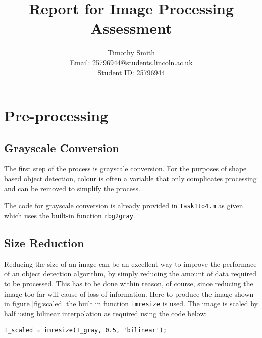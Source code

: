 \documentclass{article}
\title{Report for Image Processing Assessment}
\author{Timothy Smith \\
        Email: \href{mailto:25796944@students.lincoln.ac.uk}{25796944@students.lincoln.ac.uk} \\
        Student ID: 25796944}
\begin{document}
\begin{titlepage}
\maketitle

\end{titlepage}

\section{Pre-processing}
\subsection{Grayscale Conversion}
The first step of the process is grayscale conversion.
For the purposes of shape based object detection, colour is often a
variable that only complicates processing and can be removed to
simplify the process.

The code for grayscale
conversion is already provided in \texttt{Task1to4.m} as
given which uses the 
built-in function \texttt{rbg2gray}.

\subsection{Size Reduction}
Reducing the size of an image can be an excellent way to improve
the performace of an object detection algorithm, by simply reducing
the amount of data required to be processed. This has to be done
within reason, of course, since reducing the image
too far will cause of loss of information. Here to produce the image
shown in figure \ref{fig:scaled}
the built in function
\texttt{imresize} is used. The image is scaled by half using bilinear
interpolation as required using the code below:
\begin{verbatim}
I_scaled = imresize(I_gray, 0.5, 'bilinear');
\end{verbatim}
\end{document}

